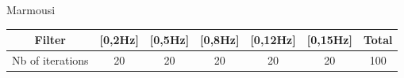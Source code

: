 \begin{frame}[noframenumbering]{Marmousi}
   \vspace{-1cm}
   \begin{table}[H]
     \scriptsize
     \centering
     \begin{tabular}{|c|c|c|c|c|c|c|}
       \hline
       Filter          & {[}0,2Hz{]} & {[}0,5Hz{]} & {[}0,8Hz{]} & {[}0,12Hz{]}& {[}0,15Hz{]}  & Total \\ \hline
       Nb of iterations& 20          & 20          & 20          & 20          &    20         & 100   \\ \hline
     \end{tabular}
     \label{freq_overthrust}
   \end{table}


\end{frame}



